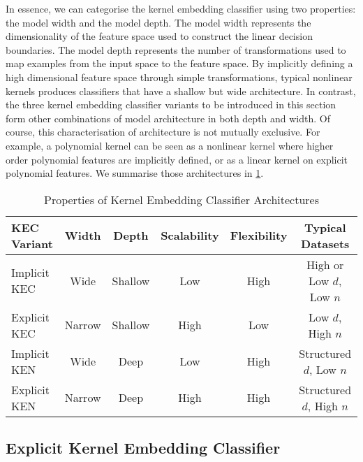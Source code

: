 \documentclass{article}
\begin{document}
	In essence, we can categorise the kernel embedding classifier using two properties: the model width and the model depth. The model width represents the dimensionality of the feature space used to construct the linear decision boundaries. The model depth represents the number of transformations used to map examples from the input space to the feature space. By implicitly defining a high dimensional feature space through simple transformations, typical nonlinear kernels produces classifiers that have a shallow but wide architecture. In contrast, the three kernel embedding classifier variants to be introduced in this section form other combinations of model architecture in both depth and width. Of course, this characterisation of architecture is not mutually exclusive. For example, a polynomial kernel can be seen as a nonlinear kernel where higher order polynomial features are implicitly defined, or as a linear kernel on explicit polynomial features. We summarise those architectures in \cref{tab:kernel_embedding_classifier_variants}.

	\begin{table}[h]
		\caption{Properties of Kernel Embedding Classifier Architectures}
		\label{tab:kernel_embedding_classifier_variants}
		\centering
		\begin{tabular}{lccccc}
			KEC Variant & Width & Depth & Scalability & Flexibility & Typical Datasets  \\
			\midrule
			Implicit KEC & Wide & Shallow & Low & High & High or Low $d$, Low $n$ \\
			Explicit KEC & Narrow & Shallow & High & Low & Low $d$, High $n$ \\
			Implicit KEN &  Wide & Deep & Low & High & Structured $d$, Low $n$ \\
			Explicit KEN & Narrow & Deep & High & High & Structured $d$, High $n$ \\ 
		\end{tabular}
	\end{table}
			
	\subsection{Explicit Kernel Embedding Classifier}
	\label{app:explicit_kernel_embedding_classifier}
	
\end{document}
